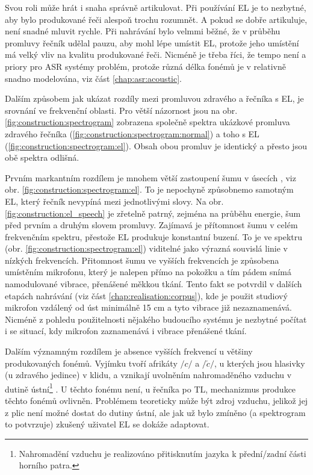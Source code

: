 Svou roli může hrát i snaha správně artikulovat. Při používání EL je to nezbytné, aby bylo produkované řeči alespoň trochu rozumnět. A pokud se dobře artikuluje, není snadné mluvit rychle. Při nahrávání bylo velmmi běžné, že v průběhu promluvy řečník udělal pauzu, aby mohl lépe umístit EL, protože jeho umístění má velký vliv na kvalitu produkované řeči. Nicméně je třeba říci, že tempo není a priory pro ASR systémy problém, protože různá délka fonémů je v relativně snadno modelována, viz část \ref{chap:asr:acoustic}.

Dalším způsobem jak ukázat rozdíly mezi promluvou zdravého a řečníka s EL, je srovnání ve frekvenční oblasti. Pro větší názornost jsou na obr. \ref{fig:construction:spectrogram} zobrazena společně spektra ukázkové promluva zdravého řečníka (\ref{fig:construction:spectrogram:normal}) a toho s EL (\ref{fig:construction:spectrogram:el}). Obsah obou promluv je identický a přesto jsou obě spektra odlišná.

Prvním markantním rozdílem je mnohem větší zastoupení šumu v úsecích , viz obr. \ref{fig:construction:spectrogram:el}. To je nepochyně způsobnemo samotným EL, který řečník nevypíná mezi jednotlivými slovy. Na obr. \ref{fig:construction:el_speech} je zřetelně patrný, zejména na průběhu energie, šum před prvním a druhým slovem promluvy. Zajímavá je přítomnost šumu v celém frekvenčním spektru, přestože EL produkuje konstantní buzení. To je ve spektru (obr. \ref{fig:construction:spectrogram:el}) viditelné jako výrazná souvislá linie v nízkých frekvencích. Přitomnost šumu ve vyšších frekvencích je způsobena umístěním mikrofonu, který je nalepen přímo na pokožku a tím pádem snímá namodulované vibrace, přenášené měkkou tkání. Tento fakt se potvrdil v dalších etapách nahrávání (viz část \ref{chap:realisation:corpus}), kde je použit studiový mikrofon vzdálený od úst minimálně 15 cm a tyto vibrace již nezaznamenává. Nicméně z pohledu použitelnosti nějakého budoucího systému je nezbytné počítat i se situací, kdy mikrofon zaznamenává i vibrace přenášené tkání.

Dalším významným rozdílem je absence vyšších frekvencí u většiny produkovaných fonémů. Vyjímku tvoří afrikáty $/c/$ a $/\check{c}/$, u kterých jsou hlasivky (u zdravého jedince) v klidu, a vznikají uvolněním nahromaděného vzduchu v dutině ústní\footnote{Nahromadění vzduchu je realizováno přitisknutím jazyka k přední/zadní části horního patra.} \cite{Psutka2006}. U těchto fonému není, u  řečníka po TL, mechanizmus produkce těchto fonémů ovlivněn. Problémem teoreticky může být zdroj vzduchu, jelikož jej z plic není možné dostat do dutiny ústní, ale jak už bylo zmíněno (a spektrogram to potvrzuje) zkušený uživatel EL se dokáže adaptovat.

